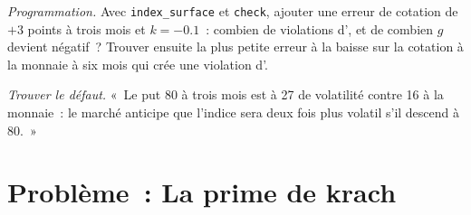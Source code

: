 \begin{exercise}[$\star\star\star$]\label{exo:dv:implied-volatility-and-its-surface:7}
\emph{Programmation.} Avec \texttt{index\_surface} et \texttt{check}, ajouter une erreur de cotation de $+3$
points à trois mois et $k=-0.1$~: combien de violations d', et de combien
$g$ devient négatif~? Trouver ensuite la plus petite erreur à la baisse sur la cotation à la monnaie à six mois qui
crée une violation d'.
\end{exercise}

\begin{exercise}[$\star\star\star$]\label{exo:dv:implied-volatility-and-its-surface:8}
\emph{Trouver le défaut.} «~Le put 80 à trois mois est à 27 de volatilité contre 16 à la monnaie~:
le marché anticipe que l'indice sera deux fois plus volatil s'il descend à 80.~»
\end{exercise}

\section{Problème~: La prime de krach}

